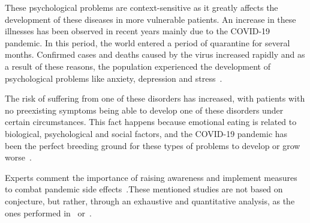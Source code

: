 These psychological problems are context-sensitive as it greatly affects the development of these diseases in more vulnerable patients. An increase in these illnesses has been observed in recent years mainly due to the COVID-19 pandemic. In this period, the world entered a period of quarantine for several months. Confirmed cases and deaths caused by the virus increased rapidly and as a result of these reasons, the population experienced the development of psychological problems like anxiety, depression and stress~\cite{ramirez2021repercusiones}.


The risk of suffering from one of these disorders has increased, with patients with no preexisting symptoms being able to develop one of these disorders under certain circumstances. This fact happens because emotional eating is related to biological, psychological and social factors, and the COVID-19 pandemic has been the perfect breeding ground for these types of problems to develop or grow worse~\cite{dos2022emotional}.





Experts comment the importance of raising awareness and implement measures to combat pandemic side effects~\cite{touyz2020eating}.These mentioned studies are not based on conjecture, but rather, through an exhaustive and quantitative analysis, as the ones performed in~\cite{j2022impact} or~\cite{vall2021impacto}. 

